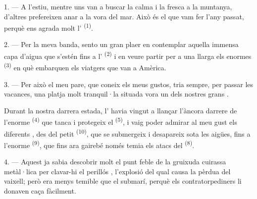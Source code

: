 %

\VUsaut{4.0mm}
\VUsaut{3.0mm}
\VUsaut{3.0mm}

1. --- A l'estiu, mentre uns van a buscar la calma i la fresca a la muntanya,
d'altres prefereixen anar a la vora del mar. Això és el que vam fer l'any passat,
perquè ens agrada molt l' \textsuperscript{(1)}.

2. --- Per la meva banda, sento un gran plaer en contemplar aquella immensa capa
d'aigua que s'estén fins a l' \textsuperscript{(2)} i en veure
partir per a una llarga  els enormes 
\textsuperscript{(3)} en què embarquen els viatgers que van a Amèrica.

3. --- Per això el meu pare, que coneix els meus gustos, tria sempre, per passar
les vacances, una platja molt tranquil·la situada vora un dels nostres grans
.

Durant la nostra darrera estada, l' havia vingut a llançar
l'àncora darrere de l'enorme  \textsuperscript{(4)} que tanca i
protegeix el  \textsuperscript{(5)}, i vaig poder admirar al
meu gust els diferents , des del petit
 \textsuperscript{(10)}, que se submergeix i desapareix sota les
aigües, fins a l'enorme  \textsuperscript{(9)}, que fins ara
gairebé només temia els atacs del  \textsuperscript{(8)}.

\VUsaut{3.0mm}
\VUsaut{3.0mm}

4. --- Aquest ja sabia descobrir molt  el punt feble de la
gruixuda cuirassa metàl·lica per clavar-hi el perillós , l'explosió
del qual causa la pèrdua del vaixell; però era menys temible que el submarí,
perquè els contratorpediners li donaven caça fàcilment.

